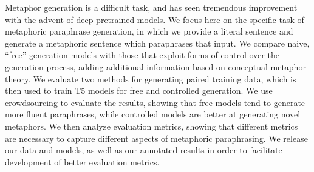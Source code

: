 Metaphor generation is a difficult task, and has seen tremendous improvement with the advent of deep pretrained models. We focus here on the specific task of metaphoric paraphrase generation, in which we provide a literal sentence and generate a metaphoric sentence which paraphrases that input. We compare naive, ``free'' generation models with those that exploit forms of control over the generation process, adding additional information based on conceptual metaphor theory. We evaluate two methods for generating paired training data, which is then used to train T5 models for free and controlled generation. We use crowdsourcing to evaluate the results, showing that free models tend to generate more fluent paraphrases, while controlled models are better at generating novel metaphors. We then analyze evaluation metrics, showing that different metrics are necessary to capture different aspects of metaphoric paraphrasing. We release our data and models, as well as our annotated results in order to facilitate development of better evaluation metrics.
